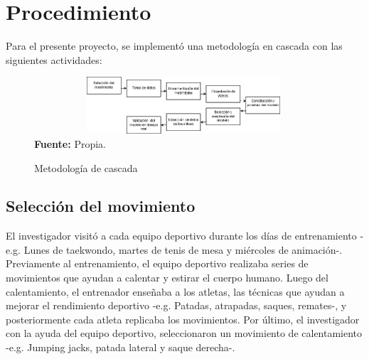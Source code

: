 \section{Procedimiento}
Para el presente proyecto, se implement\'o una metodolog\'ia en cascada con las siguientes  actividades:
\begin{figure}[H]
	\caption{Metodolog\'ia de cascada}
	\label{fig:segVideo}
	\centering
	\includegraphics[width=420px,height=80px]{graphics/cascada.PNG} \\
	\textbf{Fuente:} Propia.
\end{figure} 
\subsection{Selecci\'on del movimiento}
El investigador visit\'o a cada equipo deportivo durante los d\'ias de entrenamiento -e.g. Lunes de taekwondo, martes de tenis de mesa y mi\'ercoles de animaci\'on-.  Previamente al entrenamiento, el equipo deportivo realizaba series de movimientos que ayudan a calentar y estirar el cuerpo humano.  Luego del calentamiento, el entrenador ense\~naba a los atletas, las t\'ecnicas que ayudan a mejorar el rendimiento deportivo -e.g. Patadas, atrapadas, saques, remates-, y posteriormente cada atleta replicaba los movimientos. Por \'ultimo, el investigador con la ayuda del equipo deportivo, seleccionaron un movimiento de calentamiento -e.g. Jumping jacks, patada lateral y saque derecha-.
